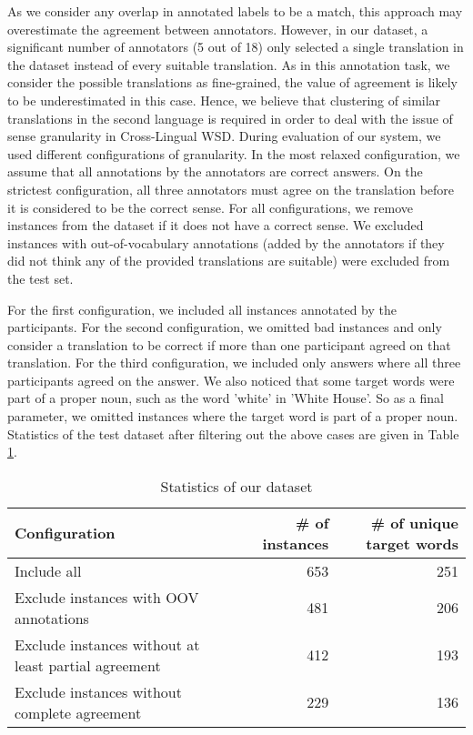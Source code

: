 \documentclass[11pt]{article}
\begin{document}
{As we consider any overlap in annotated labels to be a match, this approach may overestimate the agreement between annotators. However, in our dataset, a significant number of annotators (5 out of 18) only selected a single translation in the dataset instead of every suitable translation. As in this annotation task, we consider the possible translations as  fine-grained, the value of agreement is likely to be underestimated in this case. Hence, we believe that clustering of similar translations in the second language is required in order to deal with the issue of sense granularity in Cross-Lingual WSD. During evaluation of our system, we used different configurations of granularity. In the most relaxed configuration, we assume that all annotations by the annotators are correct answers. On the strictest configuration, all three annotators must agree on the translation before it is considered to be the correct sense. For all configurations, we remove instances from the dataset if it does not have a correct sense. We excluded instances with out-of-vocabulary annotations (added by the annotators if they did not think any of the provided translations are suitable) were excluded from the test set.


For the first configuration, we included all instances annotated by the participants. For the second configuration, we omitted bad instances and only consider a translation to be correct if more than one participant agreed on that translation. For the third configuration, we included only answers where all three participants agreed on the answer. We also noticed that some target words were part of a proper noun, such as the word 'white' in 'White House'. So as a final parameter, we omitted instances where the target word is part of a proper noun. Statistics of the test dataset after filtering out the above cases are given in Table \ref{table:CLWSD-test-stats-no-ne}.


\begin{table}[ht]
	\caption{Statistics of our dataset}
	\label{table:CLWSD-test-stats-no-ne}
	\begin{center}
		\begin{tabular}{| p{8cm} | r| r|}
			\hline
			Configuration & \# of instances & \# of unique target words \\
			\hline
			Include all & 653 & 251\\ 
			\hline
			Exclude instances with OOV annotations & 481 & 206 \\						
			\hline
			Exclude instances without at least partial agreement & 412 & 193 \\
			\hline
			Exclude instances without complete agreement & 229 & 136 \\
			\hline
		\end{tabular}
	\end{center}
\end{table}

}
\end{document}
